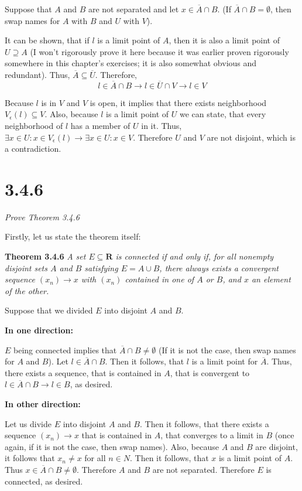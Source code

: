 \documentclass[11pt,oneside,titlepage]{book}
\begin{document}
Suppose that $A$ and $B$ are not separated and let $x \in \overline A \cap B$.
(If $\overline A \cap B = \emptyset$, then swap names for  $A$ with $B$ and
$U$ with $V$).

It can be shown, that if $l$ is a limit point of $A$, then it is also a limit
point of $U \supseteq A$ (I won't rigorously prove it here because it was
earlier proven rigorously somewhere in this chapter's exercises; it is
also somewhat obvious and redundant). Thus,
$\overline A \subseteq \overline U$. Therefore,
$$l \in \overline A \cap B \to l \in \overline U \cap V \to l \in V$$

Because $l$ is in $V$ and $V$ is open, it implies
that there exists neighborhood
$V_\epsilon(l) \subseteq V$. Also, because $l$ is a limit point of $U$ we
can state, that every neighborhood of $l$ has a member of $U$ in it.
Thus, $\exists x \in U: x \in V_\epsilon(l) \to
\exists x \in U: x \in V$. Therefore $U$ and $V$ are not disjoint, which is
a contradiction.

\section*{3.4.6}
\textit{Prove Theorem 3.4.6}

Firstly, let us state the theorem itself:

\textbf{Theorem 3.4.6}
\textit{A set $E \subseteq \textbf{R}$ is connected if and only if, for all
  nonempty disjoint sets $A$ and $B$ satisfying $E = A \cup B$, there always
  exists a convergent sequence $(x_n) \to x$ with $(x_n)$ contained in one of
  $A$ or $B$, and $x$ an element of the other.}

Suppose that we divided $E$ into disjoint $A$ and $B$.

\textbf{In one direction:}

$E$ being connected implies that $\overline A \cap B \neq \emptyset$ (If
it is not the case, then swap names for $A$ and $B$). Let
$l \in \overline A \cap B$. Then it follows, that $l$ is a limit point for
$\overline A$. Thus, there exists a sequence, that is contained in $A$,
that is convergent to $l \in \overline A \cap B \to l \in B$, as desired.

\textbf{In other direction:}

Let us divide $E$ into disjoint $A$ and $B$. Then it follows, that there
exists a sequence $(x_n) \to x$ that is contained in $A$, that converges to a
limit in $B$ (once again, if it is not the case, then swap names).
Also, because $A$ and $B$ are disjoint, it follows that $x_n \neq x$ for
all $n \in N$.
Then it follows, that $x$ is a limit point of $A$. Thus
$x \in \overline A \cap B \neq \emptyset$. Therefore $A$ and $B$ are not
separated. Therefore $E$ is connected, as desired.
\end{document}
